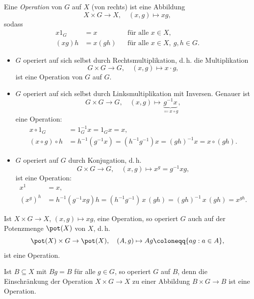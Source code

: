 \documentclass[11pt]{article}
\begin{document}
\begin{definition}[Operation]\Theorem
  Eine \emph{Operation} von $G$ auf $X$ (von rechts) ist eine Abbildung
  \[ X \times G \to X, \quad (x, g) \mapsto xg, \]
  sodass
  \begin{align*}
    x 1_G &= x && \text{für alle } x \in X, \\
    (xg)h &= x(gh) && \text{für alle } x \in X,\ g, h \in G.
  \end{align*}
\end{definition}

\begin{example}
  \begin{itemize}
    \item $G$ operiert auf sich selbst durch \glqq Rechtsmultiplikation\grqq, d.\,h. die Multiplikation
      \[ G \times G \to G, \quad (x, g) \mapsto x \cdot g, \]
      ist eine Operation von $G$ auf $G$.
    \item $G$ operiert auf sich selbst durch \glqq Linksmultiplikation mit Inversen\grqq. Genauer ist
      \[ G \times G \to G, \quad (x, g) \mapsto \underbrace{g^{-1} x}_{\eqqcolon x \circ g}, \]
      eine Operation:
      \begin{align*}
        x \circ 1_G &= 1_G^{-1} x = 1_G x = x, \\
        (x \circ g) \circ h &= h^{-1} (g^{-1} x) = (h^{-1} g^{-1}) x = (gh)^{-1} x = x \circ (gh).
      \end{align*}
    \item $G$ operiert auf $G$ durch Konjugation, d.\,h.
      \[ G \times G \to G, \quad (x, g) \mapsto x^g = g^{-1} x g, \]
      ist eine Operation:
      \begin{align*}
        x^1 &= x, \\
        (x^g)^h &= h^{-1} (g^{-1} x g) h = (h^{-1} g^{-1})\, x\, (gh) = (gh)^{-1}\, x\, (gh) = x^{gh}.
      \end{align*}
  \end{itemize}
\end{example}

\begin{note}
  Ist $X \times G \to X$, $(x, g) \mapsto xg$, eine Operation, so operiert $G$ auch auf der Potenzmenge $\pot(X)$ von $X$, d.\,h.
  \[ \pot(X) \times G \to \pot(X), \quad (A, g) \mapsto Ag \coloneqq \{ag : a \in A\}, \]
  ist eine Operation.

  Ist $B \subseteq X$ mit $Bg = B$ für alle $g \in G$, so operiert $G$ auf $B$, denn die Einschränkung der Operation $X \times G \to X$ zu einer Abbildung $B \times G \to B$ ist eine Operation.
\end{note}
\end{document}
